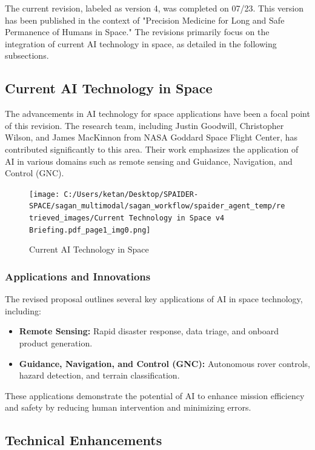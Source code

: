 \documentclass[a4paper, 11pt]{article}
\begin{document}
The current revision, labeled as version 4, was completed on 07/23. This version has been published in the context of "Precision Medicine for Long and Safe Permanence of Humans in Space." The revisions primarily focus on the integration of current AI technology in space, as detailed in the following subsections.

\subsection{Current AI Technology in Space}

The advancements in AI technology for space applications have been a focal point of this revision. The research team, including Justin Goodwill, Christopher Wilson, and James MacKinnon from NASA Goddard Space Flight Center, has contributed significantly to this area. Their work emphasizes the application of AI in various domains such as remote sensing and Guidance, Navigation, and Control (GNC).

\begin{figure}[htbp]
    \centering
    \texttt{[image: C:/Users/ketan/Desktop/SPAIDER-SPACE/sagan\_multimodal/sagan\_workflow/spaider\_agent\_temp/retrieved\_images/Current Technology in Space v4 Briefing.pdf\_page1\_img0.png]}
    \caption{Current AI Technology in Space}
    \label{fig:current-ai-tech}
\end{figure}

\subsubsection{Applications and Innovations}

The revised proposal outlines several key applications of AI in space technology, including:

\begin{itemize}
    \item \textbf{Remote Sensing:} Rapid disaster response, data triage, and onboard product generation.
    \item \textbf{Guidance, Navigation, and Control (GNC):} Autonomous rover controls, hazard detection, and terrain classification.
\end{itemize}

These applications demonstrate the potential of AI to enhance mission efficiency and safety by reducing human intervention and minimizing errors.

\subsection{Technical Enhancements}
\end{document}
